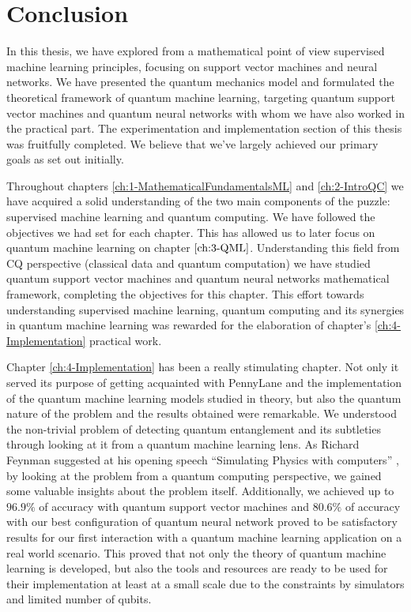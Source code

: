 
\chapter{Conclusion}\label{ch:conclusion}
In this thesis, we have explored from a mathematical point of view supervised machine learning principles, focusing on support vector machines and neural networks. We have presented the quantum mechanics model and formulated the theoretical framework of quantum machine learning, targeting quantum support vector machines and quantum neural networks with whom we have also worked in the practical part. The experimentation and implementation section of this thesis was fruitfully completed.  We believe that we've largely achieved our primary goals as set out initially.

Throughout chapters \ref{ch:1-MathematicalFundamentalsML} and \ref{ch:2-IntroQC} we have acquired a solid understanding of the two main components of the puzzle: supervised machine learning and quantum computing. We have followed the objectives we had set for each chapter. This has allowed us to later focus on quantum machine learning on chapter $\ref{ch:3-QML}$. Understanding this field from CQ perspective (classical data and quantum computation) we have studied quantum support vector machines and quantum neural networks mathematical framework, completing the objectives for this chapter. This effort towards understanding supervised machine learning, quantum computing and its synergies in quantum machine learning was rewarded for the elaboration of chapter's \ref{ch:4-Implementation} practical work. 

Chapter \ref{ch:4-Implementation} has been a really stimulating chapter. Not only it served its purpose of getting acquainted with PennyLane and the implementation of the quantum machine learning models studied in theory, but also the quantum nature of the problem and the results obtained were remarkable. We understood the non-trivial problem of detecting quantum entanglement and its subtleties through looking at it from a quantum machine learning lens. As Richard Feynman suggested at his opening speech ``Simulating Physics with computers'' \cite{Feynman}, by looking at the problem from a quantum computing perspective, we gained some valuable insights about the problem itself. Additionally, we achieved up to $96.9\%$ of accuracy with quantum support vector machines and $80.6\%$ of accuracy with our best configuration of quantum neural network proved to be satisfactory results for our first interaction with a quantum machine learning application on a real world scenario. This proved that not only the theory of quantum machine learning is developed, but also the tools and resources are ready to be used for their implementation at least at a small scale due to the constraints by simulators and limited number of qubits.


